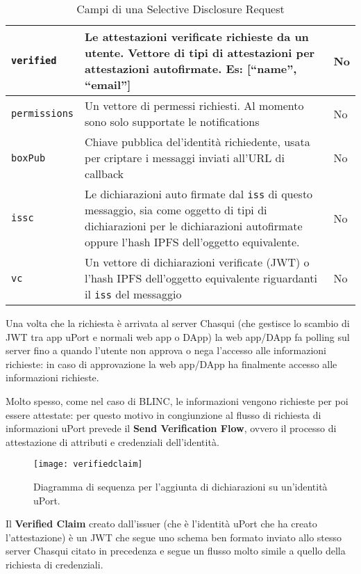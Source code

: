 \begin{table}[htbp]
\begin{tabular}{p{6.165em}p{19.89em}p{6.335em}}
      \midrule
      \texttt{verified} & Le attestazioni verificate richieste da un utente. Vettore di tipi di attestazioni per attestazioni autofirmate. Es: [“name”, “email”] & No \\
      \midrule
      \texttt{permissions} & Un vettore di permessi richiesti. Al momento sono solo supportate le notifications & No \\
      \midrule
      \texttt{boxPub} & Chiave pubblica del'identità richiedente, usata per criptare i messaggi inviati all'URL di callback & No \\
      \midrule
      \texttt{issc} & Le dichiarazioni auto firmate dal \texttt{iss} di questo messaggio, sia come oggetto di tipi di dichiarazioni
      per le dichiarazioni autofirmate oppure l'hash IPFS dell'oggetto equivalente. & No \\
      \midrule
      \texttt{vc} & Un vettore di dichiarazioni verificate (JWT) o l'hash IPFS dell'oggetto equivalente riguardanti
      il \texttt{iss} del messaggio  & No \\
      \bottomrule
      \end{tabular}%
    \label{tab:selectivedisclosurerequest}%
    \caption{Campi di una Selective Disclosure Request}
  \end{table}%

Una volta che la richiesta è arrivata al server
Chasqui (che gestisce lo scambio di JWT tra app uPort e normali web app o DApp)
la web app/DApp fa polling sul server fino a quando l’utente non approva o nega
l’accesso alle informazioni richieste: in caso di approvazione la web app/DApp ha
finalmente accesso alle informazioni richieste.

Molto spesso, come nel caso di BLINC, le informazioni vengono richieste per poi essere
attestate: per questo motivo
in congiunzione al flusso di richiesta di informazioni uPort prevede il
\textbf{Send Verification Flow}, ovvero il processo di attestazione di attributi
e credenziali dell’identità.

\newpage

\begin{figure}[!ht]
    \texttt{[image: verifiedclaim]}
    \caption{Diagramma di sequenza per l'aggiunta di dichiarazioni su un'identità uPort.}
    \label{fig:verifiedclaim}
\end{figure}

Il \textbf{Verified Claim} creato dall’issuer (che è l’identità uPort che ha creato l’attestazione)
è un JWT che segue uno schema ben formato inviato allo stesso server Chasqui citato
in precedenza e segue un flusso molto simile a quello della richiesta di credenziali.

